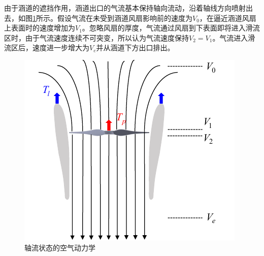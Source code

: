 


由于涵道的遮挡作用，涵道出口的气流基本保持轴向流动，沿着轴线方向喷射出去，如图\ref{轴流管道模型}所示。假设气流在未受到涵道风扇影响前的速度为$V_0$，在逼近涵道风扇上表面时的速度增加为$V_1$。忽略风扇的厚度，气流通过风扇到下表面即将进入滑流区时，由于气流速度连续不可突变，所以认为气流速度保持$V_2=V_1$。气流进入滑流区后，速度进一步增大为$V_e$并从涵道下方出口排出。

\begin{figure}[htbp]
	\centering
	\begin{minipage}[c]{1\textwidth}
		\centering
		\includegraphics[scale=1]{Fig/轴流管道模型.pdf}
		\caption{\label{轴流管道模型}轴流状态的空气动力学}
	\end{minipage}%
\end{figure}

